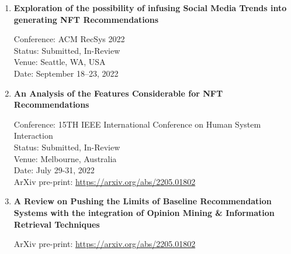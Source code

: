 \begin{enumerate}
\item \textbf{Exploration of the possibility of infusing Social Media Trends into generating NFT Recommendations}

Conference: ACM RecSys 2022 \\
Status: Submitted, In-Review \\
Venue: Seattle, WA, USA \\
Date: September 18–23, 2022 \\

\item \textbf{An Analysis of the Features Considerable for NFT Recommendations}

Conference: 15TH IEEE International Conference on Human System Interaction \\
Status: Submitted, In-Review \\
Venue: Melbourne, Australia\\
Date: July 29-31, 2022 \\
ArXiv pre-print: \url{https://arxiv.org/abs/2205.01802} \\

\item \textbf{A Review on Pushing the Limits of Baseline Recommendation Systems with the integration of Opinion Mining \& Information Retrieval Techniques}

ArXiv pre-print: \url{https://arxiv.org/abs/2205.01802} \\

\end{enumerate}
